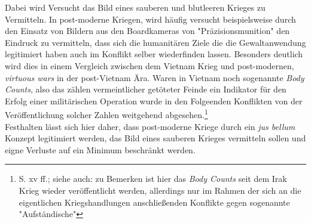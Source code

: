 \documentclass[11pt,a4paper,oneside,numbers=noenddot,bibliography=totocnumbered,DIV=13]{scrartcl}
\begin{document}
Dabei wird Versucht das Bild eines sauberen und blutleeren Krieges zu Vermitteln. In post-moderne Kriegen, wird häufig versucht beispielsweise durch den Einsatz von Bildern aus den Boardkameras von "Präzisionsmunition" den Eindruck zu vermitteln, dass sich die humanitären Ziele die die Gewaltanwendung legitimiert haben auch im Konflikt selber wiederfinden lassen. Besonders deutlich wird dies in einem Vergleich zwischen dem Vietnam Krieg und post-modernen, \textit{virtuous wars} in der post-Vietnam Ära. Waren in Vietnam noch sogenannte \textit{Body Counts}, also das zählen vermeintlicher getöteter Feinde ein Indikator für den Erfolg einer militärischen Operation wurde in den Folgeenden Konflikten von der Veröffentlichung solcher Zahlen weitgehend abgesehen.\footnote{\cite{DerDerian2001} S. xv ff.; siehe auch: \cite{graham_enemy_2005} zu Bemerken ist hier das \textit{Body Counts} seit dem Irak Krieg wieder veröffentlicht werden, allerdings nur im Rahmen der sich an die eigentlichen Kriegshandlungen anschließenden Konflikte  gegen sogenannte "Aufständische"}      \\
Festhalten lässt sich hier daher, dass post-moderne Kriege durch ein \textit{jus bellum} Konzept legitimiert werden, das Bild eines sauberen Krieges vermitteln sollen und eigne Verluste auf ein Minimum beschränkt werden.
\end{document}
